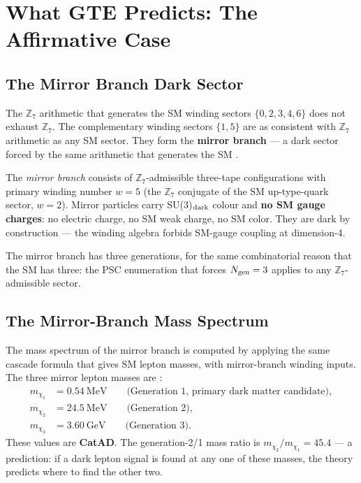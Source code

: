 \documentclass[11pt,a4paper]{article}
\newcommand{\term}[1]{\textbf{#1}}
\newcommand{\CatAD}{\textbf{CatAD}}
\begin{document}
\section{What GTE Predicts: The Affirmative Case}
\label{sec:predictions}

\subsection{The Mirror Branch Dark Sector}

The $\mathbb{Z}_7$ arithmetic that generates the SM winding sectors
$\{0,2,3,4,6\}$ does not exhaust $\mathbb{Z}_7$.  The complementary winding
sectors $\{1,5\}$ are as consistent with $\mathbb{Z}_7$ arithmetic as any SM
sector.  They form the \term{mirror branch} — a dark sector forced by the same
arithmetic that generates the SM \cite{SpivackGTECompleteFramework}.

\begin{tcolorbox}[colback=boxorange,colframe=orange!60!black,
  title={Definition: Mirror Branch (\CatAD)}]
The \emph{mirror branch} consists of $\mathbb{Z}_7$-admissible three-tape
configurations with primary winding number $w = 5$ (the $\mathbb{Z}_7$
conjugate of the SM up-type-quark sector, $w = 2$).  Mirror particles carry
SU(3)$_{\rm dark}$ colour and \textbf{no SM gauge charges}: no electric charge,
no SM weak charge, no SM color.  They are dark by construction — the winding
algebra forbids SM-gauge coupling at dimension-4.
\end{tcolorbox}

The mirror branch has three generations, for the same combinatorial reason that
the SM has three: the PSC enumeration that forces $N_{\rm gen} = 3$ applies to
any $\mathbb{Z}_7$-admissible sector.

\subsection{The Mirror-Branch Mass Spectrum}

The mass spectrum of the mirror branch is computed by applying the same cascade
formula that gives SM lepton masses, with mirror-branch winding inputs.  The
three mirror lepton masses are \cite{SpivackGTECompleteFramework}:
\begin{align}
  m_{\chi_1} &= 0.54~\text{MeV} \qquad \text{(Generation 1, primary dark matter candidate)},\\
  m_{\chi_2} &= 24.5~\text{MeV} \qquad \text{(Generation 2)},\\
  m_{\chi_3} &= 3.60~\text{GeV} \qquad \text{(Generation 3)}.
\end{align}
These values are \CatAD.  The generation-2/1 mass ratio is
$m_{\chi_2}/m_{\chi_1} = 45.4$ — a prediction: if a dark lepton signal is found
at any one of these masses, the theory predicts where to find the other two.
\end{document}
